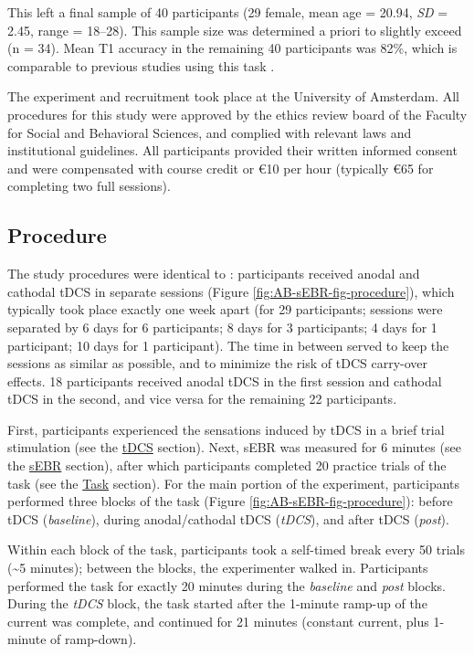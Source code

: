 \documentclass[11pt,]{memoir}
\begin{document}
This left a final sample of 40 participants (29 female, mean age = 20.94, \emph{SD} = 2.45, range = 18--28). This sample size was determined a priori to slightly exceed \textcite{London2015} (n = 34). Mean T1 accuracy in the remaining 40 participants was 82\%, which is comparable to previous studies using this task \autocites[86\% in][]{London2015}[in 82\% in][]{Slagter2013}.

The experiment and recruitment took place at the University of Amsterdam. All procedures for this study were approved by the ethics review board of the Faculty for Social and Behavioral Sciences, and complied with relevant laws and institutional guidelines. All participants provided their written informed consent and were compensated with course credit or €10 per hour (typically €65 for completing two full sessions).

\hypertarget{AB_sEBR-procedure}{%
\subsection{Procedure}\label{AB_sEBR-procedure}}

The study procedures were identical to \textcite{London2015}: participants received anodal and cathodal tDCS in separate sessions (Figure \ref{fig:AB-sEBR-fig-procedure}), which typically took place exactly one week apart (for 29 participants; sessions were separated by 6 days for 6 participants; 8 days for 3 participants; 4 days for 1 participant; 10 days for 1 participant). The time in between served to keep the sessions as similar as possible, and to minimize the risk of tDCS carry-over effects. 18 participants received anodal tDCS in the first session and cathodal tDCS in the second, and vice versa for the remaining 22 participants.

First, participants experienced the sensations induced by tDCS in a brief trial stimulation (see the \protect\hyperlink{AB_sEBR-tDCS}{tDCS} section). Next, sEBR was measured for 6 minutes (see the \protect\hyperlink{AB_sEBR-sEBR}{sEBR} section), after which participants completed 20 practice trials of the task (see the \protect\hyperlink{AB_sEBR-task}{Task} section). For the main portion of the experiment, participants performed three blocks of the task (Figure \ref{fig:AB-sEBR-fig-procedure}): before tDCS (\emph{baseline}), during anodal/cathodal tDCS (\emph{tDCS}), and after tDCS (\emph{post}).

Within each block of the task, participants took a self-timed break every 50 trials (\textasciitilde{}5 minutes); between the blocks, the experimenter walked in. Participants performed the task for exactly 20 minutes during the \emph{baseline} and \emph{post} blocks. During the \emph{tDCS} block, the task started after the 1-minute ramp-up of the current was complete, and continued for 21 minutes (constant current, plus 1-minute of ramp-down).
\end{document}
